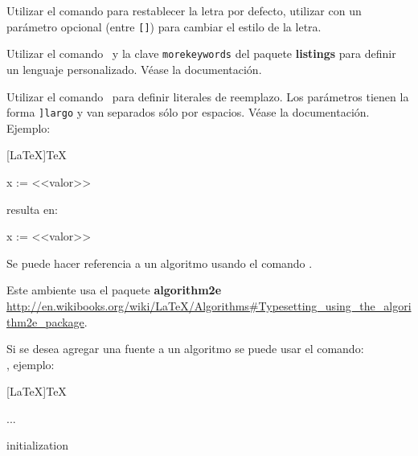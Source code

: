 Utilizar el comando  para restablecer la letra por defecto, utilizar con un parámetro opcional (entre \texttt{[]}) para cambiar el estilo de la letra.

Utilizar el comando \pa\pa\ y la clave \texttt{morekeywords} del paquete \textbf{listings} para definir un lenguaje personalizado. Véase la documentación.

Utilizar el comando \pa\ para definir literales de reemplazo. Los parámetros tienen la forma \texttt{\pa[match]\pa[\pa[reemplazo]]largo} y van separados sólo por espacios. Véase la documentación. Ejemplo:


\begin{listado}{[LaTeX]TeX}
\begin{listado~}{}
 x := <<valor>>
\end{listado~}
\end{listado}

\vspace{-16pt}\noindent
resulta en:
\vspace{-12pt}


\begin{listado}{}
 x := <<valor>>
\end{listado}



Se puede hacer referencia a un algoritmo usando el comando .

Este ambiente usa el paquete \textbf{algorithm2e} \url{http://en.wikibooks.org/wiki/LaTeX/Algorithms#Typesetting_using_the_algorithm2e_package}.

Si se desea agregar una fuente a un algoritmo se puede usar el comando: \\ , ejemplo:

\begin{listado}{[LaTeX]TeX}
  \begin{algoritmo}
      ...
  \end{algoritmo}
\end{listado}

\begin{algoritmo}
 initialization\;
\end{algoritmo}
